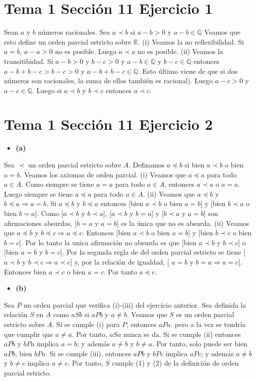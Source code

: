 \documentclass{article}
\begin{document}
\section{Tema 1 Sección 11 Ejercicio 1}
Sean $a$ y $b$ números racionales. Sea $a\prec b$ si $a-b>0$ y $a-b\in \mathbb{Q}$ Veamos que esto define un orden parcial estricto sobre $\mathbb{R}$.
(i) Veamos la no reflexibilidad. Si $a=b$, $a-a>0$ no es posible. Luego  $a\prec a$ no es posible.
(ii) Veamos la transitibidad. Si $a-b>0$ y $b-c>0$ y $a-b\in \mathbb{Q}$ y $b-c\in \mathbb{Q}$ entonces $a-b + b-c> b-c>0$ y $a-b+b-c\in \mathbb{Q}$. Esto último viene de que si dos números son racionales, la suma de ellos también es racional). Luego  $a-c>0$ y $a-c\in \mathbb{Q}$. Luego si $a\prec b$ y $b\prec c$ entonces $a\prec c$.
\section{Tema 1 Sección 11 Ejercicio 2}
\begin{itemize}
\item \bf (a) \rm
\end{itemize}
Sea $\prec$ un orden parcial estricto sobre $A$. Definamos $a\preceq b$ si bien $a\prec b$ o bien $a=b$. Veamos los axiomas de orden parcial.
(i) Veamos que $a\preceq a $ para todo $a\in A$. Como  siempre se tiene $a=a$ para todo $a\in A$, entonces $a\prec a$ o $a=a$. Luego siempre se tiene $a\preceq a$ para todo $a\in A$. (ii) Veamos que $a\preceq b$ y $b\preceq a\Rightarrow a=b$. Si $a\preceq b$ y $b\preceq a$ entonces [bien $a\prec b$ o bien $a=b$] y [bien $b\prec a$ o bien $b=a$]. Como [$a\prec b$ y $b\prec a$], [$a\prec b$ y $b= a$] y [$b\prec a$ y $a= b$] son afirmaciones absurdas, [$b=a$ y $a= b$] es la única que no es  absurda. (ii) Veamos que $a\preceq b$ y $b\preceq c\Rightarrow a\preceq c$. Entonces [bien $a\prec b$ o bien $a=b$] y [bien $b\prec c$ o bien $b=c$]. Por lo tanto la unica afirmación no absurda es que [bien $a\prec b$ y $b\prec c$] o [bien $a=b$ y $b=c$]. Por la segunda regla de del orden parcial estricto se tiene [$a\prec b$ y $b\prec c$$\Rightarrow a\prec c$] y, por la relación de igualdad, [ $a=b$ y $b=a$$\Rightarrow a=c$]. Entonces bien $a\prec c$ o bien $a=c$. Por tanto $a\preceq c$.
\begin{itemize}
\item \bf (b) \rm
\end{itemize}
Sea $P$ un orden parcial que verifica (i)-(iii) del ejercicio anterior. Sea definida la relación $S$ en $A$ como $aSb$ si $aPb$ y $a\neq b$. Veamos que $S$ es un orden parcial estricto sobre $A$. Si se cumple (i) para $P$, entonces $aPa$. pero a la vez se tendría que cumplir que $a\neq a$. Por tanto, $aSa$ nunca se da. Si se cumple (ii) entonces $aPb$ y $bPa$ implica $a=b$; y además $a\neq b$ y $b\neq a$. Por tanto, solo puede ser bien $aPb$, bien $bPa$. Si se cumple (iii), entonces $aPb$ y $bPc$ implica $aPc$; y además $a\neq b$ y $b\neq c$ implica $a\neq c$. Por tanto, $S$ cumple (1) y (2) de la definición de orden parcial estricto.
\end{document}
